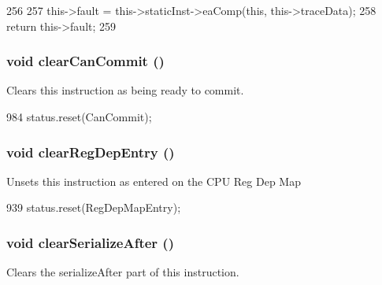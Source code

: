 \begin{DoxyCode}
256 {
257     this->fault = this->staticInst->eaComp(this, this->traceData);
258     return this->fault;
259 }
\end{DoxyCode}
\hypertarget{classInOrderDynInst_ad22bc2d91297685b76dc15215666883d}{
\subsubsection[{clearCanCommit}]{\setlength{\rightskip}{0pt plus 5cm}void clearCanCommit ()}}
\label{classInOrderDynInst_ad22bc2d91297685b76dc15215666883d}
Clears this instruction as being ready to commit. 


\begin{DoxyCode}
984 { status.reset(CanCommit); }
\end{DoxyCode}
\hypertarget{classInOrderDynInst_a51fbbc66353e7afa079def436e3e749d}{
\subsubsection[{clearRegDepEntry}]{\setlength{\rightskip}{0pt plus 5cm}void clearRegDepEntry ()}}
\label{classInOrderDynInst_a51fbbc66353e7afa079def436e3e749d}
Unsets this instruction as entered on the CPU Reg Dep Map 


\begin{DoxyCode}
939 { status.reset(RegDepMapEntry); }
\end{DoxyCode}
\hypertarget{classInOrderDynInst_abe42baa87e7660df60248deec78f8d5a}{
\subsubsection[{clearSerializeAfter}]{\setlength{\rightskip}{0pt plus 5cm}void clearSerializeAfter ()}}
\label{classInOrderDynInst_abe42baa87e7660df60248deec78f8d5a}
Clears the serializeAfter part of this instruction. 


